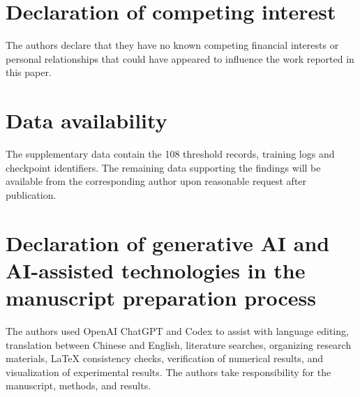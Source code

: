 \documentclass[preprint,12pt,nonatbib]{elsarticle}
\begin{document}
\section*{Declaration of competing interest}
The authors declare that they have no known competing financial interests or personal relationships that could have appeared to influence the work reported in this paper.

\section*{Data availability}
The supplementary data contain the 108 threshold records, training logs and checkpoint identifiers. The remaining data supporting the findings will be available from the corresponding author upon reasonable request after publication.

\section*{Declaration of generative AI and AI-assisted technologies in the manuscript preparation process}
The authors used OpenAI ChatGPT and Codex to assist with language editing, translation between Chinese and English, literature searches, organizing research materials, \LaTeX{} consistency checks, verification of numerical results, and visualization of experimental results. The authors take responsibility for the manuscript, methods, and results.

\FloatBarrier
\printbibliography
\end{document}
